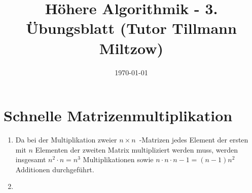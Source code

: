 \documentclass[a4paper,10pt]{scrartcl}
\title{H\"ohere Algorithmik - 3. \"Ubungsblatt (Tutor Tillmann Miltzow)}
\author{\Authors}
\date{\today}
\begin{document}
\maketitle

\section{Schnelle Matrizenmultiplikation}
\begin{enumerate}
\item	Da bei der Multiplikation zweier $n \times n$~-Matrizen jedes
	Element der ersten mit $n$ Elementen der zweiten Matrix
	multipliziert werden muss, werden insgesamt $n^2 \cdot n = n^3$
	Multiplikationen sowie $n \cdot n \cdot n-1 = (n-1)n^2$
	Additionen durchgeführt.

\item
\end{enumerate}
\end{document}
